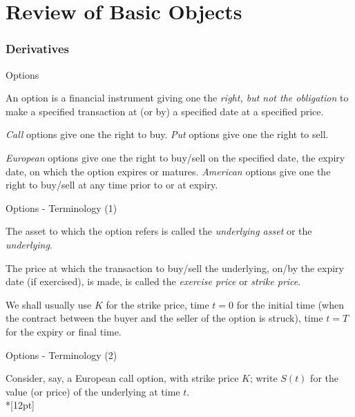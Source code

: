 
\part{Review of Basic Objects}

\section{Derivatives}

{Options}







	An option is a financial instrument giving one the {\it right, but
not the obligation} to make a specified transaction at (or by) a
specified date at a specified price.


	{\it Call} options give one
the right to buy. {\it Put} options give one the right to sell.


	{\it European} options give one the right to buy/sell on the
specified date, the expiry date, on which the option expires or
matures. {\it American} options give one the right to buy/sell at any time
prior to or at expiry.





{Options - Terminology (1)}







	The asset to which the option refers is called the {\it underlying
asset} or the {\it underlying}.


	
The price at which the transaction
to buy/sell the underlying, on/by the expiry date (if exercised),
is made, is called the {\it exercise price} or {\it strike price}.


	We shall usually use $K$ for the strike price, time $t = 0$ for
the initial time (when the contract between the buyer and the
seller of the option is struck), time $t = T$ for the expiry or
final time.





{Options - Terminology (2)}

Consider, say, a European call option, with strike price $K$;
write $S(t)$ for the value (or price) of the underlying at time
$t$.\\*[12pt]


